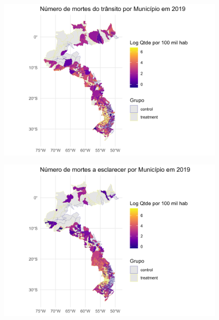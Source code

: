 \documentclass{beamer}
\begin{document}
\begin{frame}
	\begin{figure}
		\centering
		\includegraphics[width=1\linewidth]{figures/mapa_transito}
		\label{fig:histoghom}
	\end{figure}
\end{frame}

\begin{frame}
	\begin{figure}
		\centering
		\includegraphics[width=1\linewidth]{figures/mapa_esclarecer}
		\label{fig:histoghom}
	\end{figure}
\end{frame}
\end{document}
